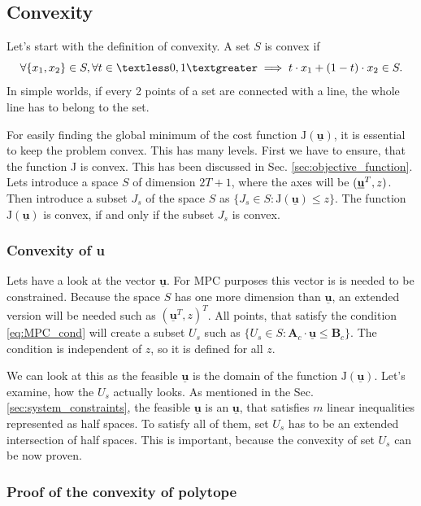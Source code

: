 \documentclass[a4paper,11pt,titlepage]{article}
\newcommand{\uvec}{\textbf{\underline{u}}}
\begin{document}
\subsection{Convexity}
\label{sec:convexity}
Let's start with the definition of convexity. A set $S$ is convex if
\begin{equation}
\label{eq:convexity_definition}
\forall\{x_1, x_2\} \in S, \forall t \in  \textless 0, 1 \textgreater \implies t \cdot x_1 + (1-t) \cdot x_2 \in S.
\end{equation}
In simple worlds, if every 2 points of a set are connected with a line, the whole line has to belong to the set.

For easily finding the global minimum of the cost function $\mathrm{J}(\underline{\textbf{u}})$, it is essential to keep the problem convex. This has many levels. First we have to ensure, that the function J is convex. This has been discussed in Sec. \ref{sec:objective_function}. Lets introduce a space $S$ of dimension $2T+1$, where the axes will be $(\uvec^T, z)$. Then introduce a subset $J_s$ of the space $S$ as $\{J_s \in S : \mathrm{J}(\underline{\textbf{u}}) \leq z\}$. The function $\mathrm{J}(\underline{\textbf{u}})$ is convex, if and only if the subset $J_s$ is convex. 
\subsubsection{Convexity of u}
Lets have a look at the vector $\underline{\textbf{u}}$. For MPC purposes this vector is is needed to be constrained. Because the space $S$ has one more dimension than $\underline{\textbf{u}}$, an extended version will be needed such as $(\underline{\textbf{u}}^T, z)^T$.
All points, that satisfy the condition \ref{eq:MPC_cond} will create a subset $U_s$ such as $\{U_s \in S : \textbf{A}_c \cdot \underline{\textbf{u}} \leq \textbf{B}_c\}$. The condition is independent of $z$, so it is defined for all $z$. 

We can look at this as the feasible $\underline{\textbf{u}}$ is the domain of the function $\mathrm{J}(\underline{\textbf{u}})$. Let's examine, how the $U_s$ actually looks. As mentioned in the Sec. \ref{sec:system_constraints}, the feasible $\underline{\textbf{u}}$ is an $\underline{\textbf{u}}$, that satisfies $m$ linear inequalities represented as half spaces. To satisfy all of them, set $U_s$ has to be an extended intersection of half spaces. This is important, because the convexity of set $U_s$ can be now proven. 

\subsubsection{Proof of the convexity of polytope}
\end{document}
